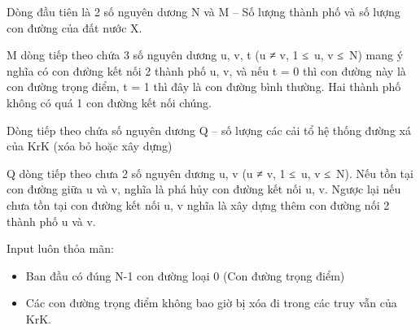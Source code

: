 Dòng đầu tiên là 2 số nguyên dương N và M – Số lượng thành phố và số lượng con đường của đất nước X.  

   M dòng tiếp theo chứa 3 số nguyên dương u, v, t (u ≠ v, 1 ≤ u, v ≤ N) mang ý nghĩa có con đường kết nối 2 thành phố u, v, và nếu t = 0 thì con đường này là con đường trọng điểm, t = 1 thì đây là con đường bình thường. Hai thành phố không có quá 1 con đường kết nối chúng.  

   Dòng tiếp theo chứa số nguyên dương Q – số lượng các cải tổ hệ thống đường xá của KrK (xóa bỏ hoặc xây dựng)  

   Q dòng tiếp theo chưa 2 số nguyên dương u, v (u ≠ v, 1 ≤ u, v ≤ N). Nếu tồn tại con đường giữa u và v, nghĩa là phá hủy con đường kết nối u, v. Ngược lại nếu chưa tồn tại con đường kết nối u, v nghĩa là xây dựng thêm con đường nối 2 thành phố u và v.  

   Input luôn thỏa mãn:  
\begin{itemize}
	\item     Ban đầu có đúng N-1 con đường loại 0 (Con đường trọng điểm)   
	\item     Các con đường trọng điểm không bao giờ bị xóa đi trong các truy vẫn của KrK.   
\end{itemize}